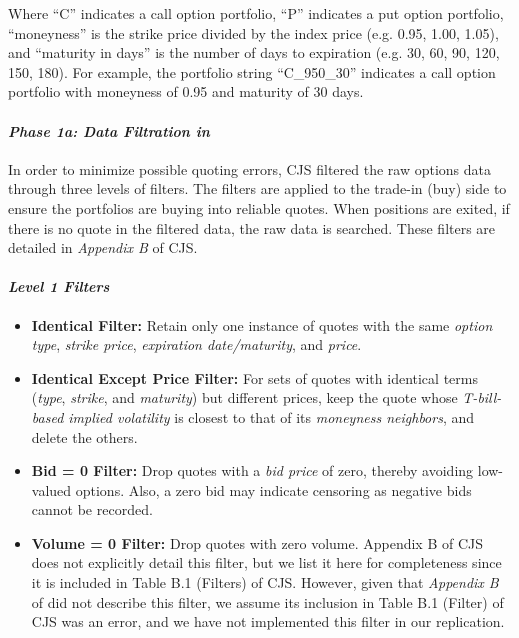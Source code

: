 \documentclass{article}
\begin{document}
\begin{appendices}
Where ``C'' indicates a call option portfolio, ``P'' indicates a put option portfolio, ``moneyness'' is the strike price divided by the index price (e.g. 0.95, 1.00, 1.05), and ``maturity in days'' is the number of days to expiration (e.g. 30, 60, 90, 120, 150, 180). For example, the portfolio string ``C\_950\_30'' indicates a call option portfolio with moneyness of 0.95 and maturity of 30 days.



\paragraph{\textit{Phase 1a: Data Filtration in \citet{Constantinides2013}}}

In order to minimize possible quoting errors, CJS filtered the raw options data through three levels of filters. The filters are applied to the trade-in (buy) side to ensure the portfolios are buying into reliable quotes. When positions are exited, if there is no quote in the filtered data, the raw data is searched. These filters are detailed in \textit{Appendix B} of CJS.




\paragraph{\textit{Level 1 Filters}}
\begin{itemize}
  \item \textbf{Identical Filter:} Retain only one instance of quotes with the same \textit{option type}, \textit{strike price}, \textit{expiration date/maturity}, and \textit{price}.
  \item \textbf{Identical Except Price Filter:} For sets of quotes with identical terms (\textit{type}, \textit{strike}, and \textit{maturity}) but different prices, keep the quote whose \textit{T-bill-based implied volatility} is closest to that of its \textit{moneyness neighbors}, and delete the others.
  \item \textbf{Bid = 0 Filter:} Drop quotes with a \textit{bid price} of zero, thereby avoiding low-valued options. Also, a zero bid may indicate censoring as negative bids cannot be recorded.
  \item \textbf{Volume = 0 Filter:} Drop quotes with zero volume. Appendix B of CJS does not explicitly detail this filter, but we list it here for completeness since it is included in Table B.1 (Filters) of CJS. However, given that \textit{Appendix B} of \citet{Constantinides2013} did not describe this filter, we assume its inclusion in Table B.1 (Filter) of CJS was an error, and we have not implemented this filter in our replication.
\end{itemize}



\end{appendices}
\end{document}
